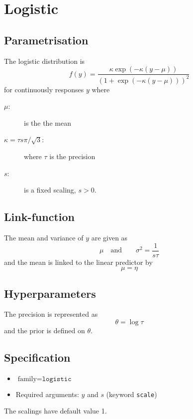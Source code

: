\documentclass[a4paper,11pt]{article}
\begin{document}
\section*{Logistic}

\subsection*{Parametrisation}

The logistic distribution is
\begin{displaymath}
    f(y) = \frac{\kappa \exp(-\kappa(y-\mu))}{
        (1 + \exp(-\kappa(y-\mu)))^{2}}
\end{displaymath}
for continuously responses $y$ where
\begin{description}
\item[$\mu$:] is the the mean
\item[$\kappa = \tau s \pi/\sqrt{3}$:] where $\tau$ is the precision
\item[$s$:] is a fixed scaling, $s>0$.    
\end{description}

\subsection*{Link-function}

The mean and variance of $y$ are given as
\begin{displaymath}
    \mu \quad\text{and}\qquad \sigma^{2} = \frac{1}{s\tau}
\end{displaymath}
and the mean is linked to the linear predictor by
\begin{displaymath}
    \mu = \eta
\end{displaymath}

\subsection*{Hyperparameters}

The precision is represented as
\begin{displaymath}
    \theta = \log \tau
\end{displaymath}
and the prior is defined on $\theta$. 

\subsection*{Specification}

\begin{itemize}
\item $\text{family}=\texttt{logistic}$
\item Required arguments: $y$ and $s$ (keyword \texttt{scale})
\end{itemize}
The scalings have default value 1.
\end{document}
